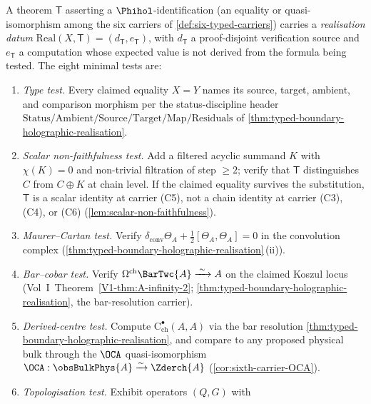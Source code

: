 \begin{definition}%
\label{def:realisation-verification-protocol-Phihol}%
%
%
A theorem $\mathsf{T}$ asserting a $\Phihol$-identification (an
equality or quasi-isomorphism among the six carriers of
\cref{def:six-typed-carriers}) carries a \emph{realisation datum}
$\mathrm{Real}(X, \mathsf{T}) = (d_{\mathsf{T}}, e_{\mathsf{T}})$,
with $d_{\mathsf{T}}$ a proof-disjoint verification source and
$e_{\mathsf{T}}$ a computation whose expected value is not derived
from the formula being tested.  The eight minimal tests are:
\begin{enumerate}[label=\textup{(T\arabic*)}]
\item \emph{Type test.}  Every claimed equality $X = Y$ names its
source, target, ambient, and comparison morphism per the
status-discipline header
$\mathrm{Status} / \mathrm{Ambient} / \mathrm{Source} / \mathrm{Target}
 / \mathrm{Map} / \mathrm{Residuals}$ of
\cref{thm:typed-boundary-holographic-realisation}.
\item \emph{Scalar non-faithfulness test.}  Add a filtered acyclic
summand $K$ with $\chi(K) = 0$ and non-trivial filtration of step
$\ge 2$; verify that $\mathsf{T}$ distinguishes $C$ from $C \oplus K$
at chain level.  If the claimed equality survives the substitution,
$\mathsf{T}$ is a scalar identity at carrier (C5), not a chain
identity at carrier (C3), (C4), or (C6)
(\cref{lem:scalar-non-faithfulness}).
\item \emph{Maurer--Cartan test.}  Verify
$\delta_{\mathrm{conv}}\Theta_{A} + \tfrac{1}{2}[\Theta_{A},\Theta_{A}]
 = 0$ in the convolution complex
(\cref{thm:typed-boundary-holographic-realisation}\,(ii)).
\item \emph{Bar--cobar test.}  Verify
$\Omega^{\mathrm{ch}}\BarTwc{A} \xrightarrow{\;\sim\;} A$ on the
claimed Koszul locus (Vol~I~Theorem~\ref*{V1-thm:A-infinity-2};
\cref{thm:typed-boundary-holographic-realisation}, the bar-resolution
carrier).
\item \emph{Derived-centre test.}  Compute
$\mathrm{C}^{\bullet}_{\mathrm{ch}}(A, A)$ via the bar resolution
\cref{thm:typed-boundary-holographic-realisation}, and
compare to any proposed physical bulk through the $\OCA$
quasi-isomorphism $\OCA : \obsBulkPhys{A} \xrightarrow{\sim}
\Zderch{A}$ (\cref{cor:sixth-carrier-OCA}).
\item \emph{Topologisation test.}  Exhibit operators $(Q, G)$ with

\end{enumerate}
\end{definition}
